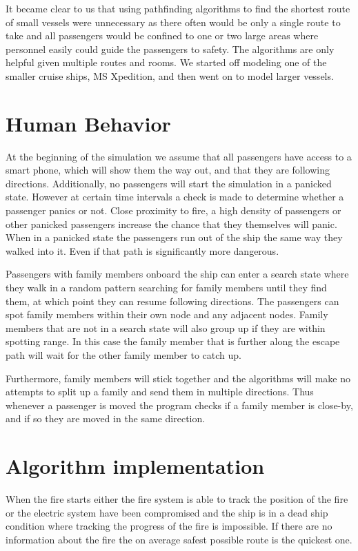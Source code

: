 It became clear to us that using pathfinding algorithms to find the shortest route of small vessels were unnecessary as  there often would be only a single route to take and all passengers would be confined to one or two large areas where personnel easily could guide the passengers to safety. The algorithms are only helpful given multiple routes and rooms. We started off modeling one of the smaller cruise ships, MS Xpedition, and then went on to model larger vessels.

\section{Human Behavior}

At the beginning of the simulation we assume that all passengers have access to a smart phone, which will show them the way out, and that they are following directions. Additionally, no passengers will start the simulation in a panicked state. However at certain time intervals a check is made to determine whether a passenger panics or not. Close proximity to fire, a high density of passengers or other panicked passengers increase the chance that they themselves will panic. When in a panicked state the passengers run out of the ship the same way they walked into it. Even if that path is significantly more dangerous.

Passengers with family members onboard the ship can enter a search state where they walk in a random pattern searching for family members until they find them, at which point they can resume following directions. The passengers can spot family members within their own node and any adjacent nodes. Family members that are not in a search state will also group up if they are within spotting range. In this case the family member that is further along the escape path will wait for the other family member to catch up.

Furthermore, family members will stick together and the algorithms will make no attempts to split up a family and send them in multiple directions. Thus whenever a passenger is moved the program checks if a family member is close-by, and if so they are moved in the same direction.

\section{Algorithm implementation}

When the fire starts either the fire system is able to track the position of the fire or the electric system have been compromised and the ship is in a dead ship condition where tracking the progress of the fire is impossible. If there are no information about the fire the on average safest possible route is the quickest one. 










